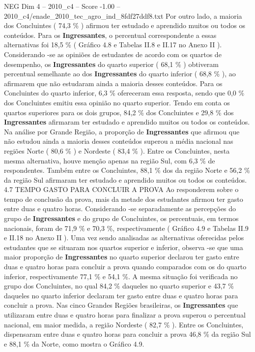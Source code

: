 \begin{textsample}{NEG Dim 4 – 2010\_c4 – Score -1.00 – 2010\_c4/enade\_2010\_tec\_agro\_ind\_8fdf27ddf8.txt}
Por outro lado, a maioria dos Concluintes ( 74,3 \% ) afirmou ter estudado e aprendido muitos ou todos os conteúdos.
Para os \textbf{Ingressantes}, o percentual correspondente a essas alternativas foi 18,5 \% ( Gráfico 4.8 e Tabelas II.8 e II.17 no Anexo II ).
Considerando -se as opiniões de estudantes de acordo com os quartos de desempenho, os \textbf{Ingressantes} do quarto superior ( 68,1 \% ) obtiveram percentual semelhante ao dos \textbf{Ingressantes} do quarto inferior ( 68,8 \% ), ao afirmarem que não estudaram ainda a maioria desses conteúdos.
Para os Concluintes do quarto inferior, 6,3 \% ofereceram essa resposta, sendo que 0,0 \% dos Concluintes emitiu essa opinião no quarto superior.
Tendo em conta os quartos superiores para os dois grupos, 84,2 \% dos Concluintes e 29,8 \% dos \textbf{Ingressantes} afirmaram ter estudado e aprendido muitos ou todos os conteúdos.
Na análise por Grande Região, a proporção de \textbf{Ingressantes} que afirmou que não estudou ainda a maioria desses conteúdos superou a média nacional nas regiões Norte ( 80,6 \% ) e Nordeste ( 83,4 \% ).
Entre os Concluintes, nesta mesma alternativa, houve menção apenas na região Sul, com 6,3 \% de respondentes.
Também entre os Concluintes, 88,1 \% dos da região Norte e 56,2 \% da região Sul afirmaram ter estudado e aprendido muitos ou todos os conteúdos. 4.7 TEMPO GASTO PARA CONCLUIR A PROVA Ao responderem sobre o tempo de conclusão da prova, mais da metade dos estudantes afirmou ter gasto entre duas e quatro horas.
Considerando -se separadamente as percepções do grupo de \textbf{Ingressantes} e do grupo de Concluintes, os percentuais, em termos nacionais, foram de 71,9 \% e 70,3 \%, respectivamente ( Gráfico 4.9 e Tabelas II.9 e II.18 no Anexo II ).
Uma vez sendo analisadas as alternativas oferecidas pelos estudantes que se situaram nos quartos superior e inferior, observa -se que uma maior proporção de \textbf{Ingressantes} no quarto superior declarou ter gasto entre duas e quatro horas para concluir a prova quando comparados com os do quarto inferior, respectivamente 77,1 \% e 54,1 \%.
A mesma situação foi verificada no grupo dos Concluintes, no qual 84,2 \% daqueles no quarto superior e 43,7 \% daqueles no quarto inferior declaram ter gasto entre duas e quatro horas para concluir a prova.
Nas cinco Grandes Regiões brasileiras, os \textbf{Ingressantes} que utilizaram entre duas e quatro horas para finalizar a prova superou o percentual nacional, em maior medida, a região Nordeste ( 82,7 \% ).
Entre os Concluintes, dispensaram entre duas e quatro horas para concluir a prova 46,8 \% da região Sul e 88,1 \% da Norte, como mostra o Gráfico 4.9.

\end{textsample}
